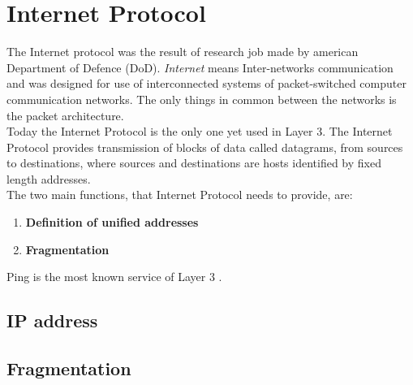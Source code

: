 \chapter{Internet Protocol}
The Internet protocol was the result of research job made by american Department of Defence (DoD). \textit{Internet} means Inter-networks communication and was designed for use of interconnected systems of packet-switched computer communication networks. The only things in common between the networks is the packet architecture.\\
Today the Internet Protocol is the only one yet used in Layer 3. The Internet Protocol provides transmission of blocks of data called datagrams, from sources to destinations, where sources and destinations are hosts identified by fixed length addresses.\\
The two main functions, that Internet Protocol needs to provide, are:
\begin{enumerate}
\item{\textbf{Definition of unified addresses}}
\item{\textbf{Fragmentation}}
\end{enumerate}
Ping is the most known service of Layer 3 \cite{RFC791}.

\section{IP address}


\section{Fragmentation}
